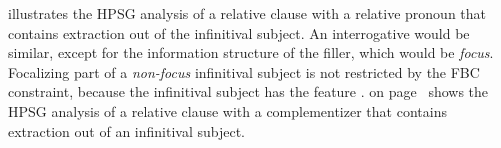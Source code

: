  illustrates the HPSG analysis of a relative clause with a relative pronoun that contains extraction out of the infinitival subject. An interrogative would be similar, except for the information structure of the filler, which would be \emph{focus}. Focalizing part of a \emph{non-focus} infinitival subject is not restricted by the FBC constraint, because the infinitival subject has the feature .  on page~\pageref{fig:CP-inf-que} shows the HPSG analysis of a relative clause with a complementizer that contains extraction out of an infinitival subject. 

\eal 
{} 
\label{ex:CP-inf-ou}
\label{ex:CP-inf-que}
\zl

